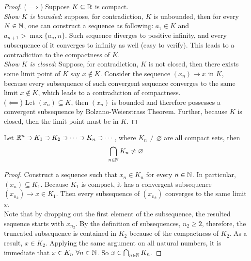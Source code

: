 \documentclass[11pt]{article}
\begin{document}
	\begin{proof}
		($\implies$) Suppose $K \subseteq \mathbb{R}$ is compact. \\
		\emph{Show $K$ is bounded}: suppose, for contradiction, $K$ is unbounded, then for every $N \in \mathbb{N}$, one can construct a sequence as following: $a_1 \in K$ and $a_{n+1} > \max\{a_n, n\}$. Such sequence diverges to positive infinity, and every subsequence of it converges to infinity as well (easy to verify). This leads to a contradiction to the compactness of $K$. \\
		\emph{Show $K$ is closed}: Suppose, for contradiction, $K$ is not closed, then there exists some limit point of $K$ say $x \notin K$. Consider the sequence $(x_n) \to x$ in $K$, because every subsequence of such convergent sequence converges to the same limit $x \notin K$, which leads to a contradiction of compactness. \\
		($\impliedby$) Let $(x_n) \subseteq K$, then $(x_n)$ is bounded and therefore possesses a convergent subsequence by Bolzano-Weierstrass Theorem. Further, because $K$ is closed, then the limit point must be in $K$.
	\end{proof}
	
	\begin{theorem}
		Let $\mathbb{R}^n \supset K_1 \supset K_2 \supset \cdots \supset K_n \supset \cdots$, where $K_n \neq \varnothing$ are all compact sets, then
		\begin{align}
			\bigcap_{n \in \mathbb{N}} K_n \neq \varnothing
		\end{align}
	\end{theorem}
	
	\begin{proof}
		Construct a sequence such that $x_n \in K_n$ for every $n \in \mathbb{N}$. In particular, $(x_n) \subseteq K_1$. Because $K_1$ is compact, it has  a convergent subsequence $(x_{n_k}) \to x \in K_1$. Then every subsequence of $(x_{n_k})$ converges to the same limit $x$.
		\\Note that by dropping out the first element of the subsequence, the resulted sequence starts with $x_{n_2}$. By the definition of subsequences, $n_2 \geq 2$, therefore, the truncated subsequence is contained in $K_2$ because of the compactness of $K_2$. As a result, $x \in K_2$. Applying the same argument on all natural numbers, it is immediate that $x \in K_n\ \forall n \in \mathbb{N}$. So $x \in \bigcap_{n \in \mathbb{N}} K_n$.
	\end{proof}
	
\end{document}
